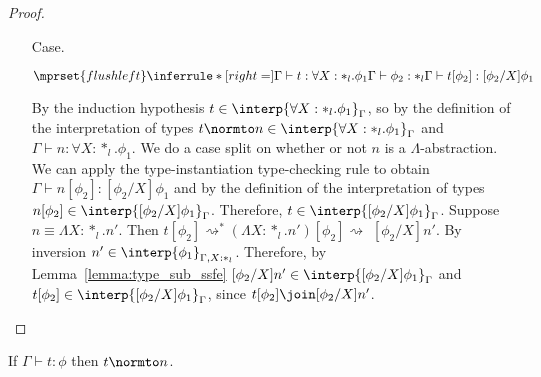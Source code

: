 \begin{proof}
\begin{itemize}
\item[Case.]\ \\
  \begin{center}
    \begin{math}
      $$\mprset{flushleft}
      \inferrule* [right=] {
        \Gamma \vdash t:\forall X:*_l.\phi_1
        \\
        \Gamma \vdash \phi_2:*_l
      }{\Gamma \vdash t[\phi_2]: [\phi_2/X]\phi_1}
    \end{math}
  \end{center}
  By the induction hypothesis $t \in \interp{\forall X:*_l.\phi_1}_\Gamma$, so by the 
  definition of the interpretation of types 
  $t \normto n \in \interp{\forall X:*_l.\phi_1}_\Gamma$ and
  $\Gamma \vdash n:\forall X:*_l.\phi_1$.  We do a case 
  split on whether or not $n$ is a $\Lambda$-abstraction. We can apply the
  type-instantiation type-checking rule to obtain 
  $\Gamma \vdash n[\phi_2]:[\phi_2/X]\phi_1$ and by the 
  definition of the interpretation of types 
  $n[\phi_2] \in \interp{[\phi_2/X]\phi_1}_\Gamma$. Therefore, 
  $t \in \interp{[\phi_2/X]\phi_1}_\Gamma$.  Suppose $n \equiv \Lambda X:*_l.n'$.  
  Then 
  $t[\phi_2] \rightsquigarrow^{*} (\Lambda X:*_l.n')[\phi_2] \rightsquigarrow $
  $ [\phi_2/X]n'$.  By inversion
  $n' \in \interp{\phi_1}_{\Gamma,X:*_l}$. Therefore, by
  Lemma~\ref{lemma:type_sub_ssfe} $[\phi_2/X]n' \in \interp{[\phi_2/X]\phi_1}_{\Gamma}$ and
  $t[\phi_2] \in \interp{[\phi_2/X]\phi_1}_{\Gamma}$, since $t[\phi_2] \join [\phi_2/X]n'$.
\end{itemize}
\end{proof}
\begin{corollary}[Normalization]
  If $\Gamma \vdash t:\phi$ then $t \normto n$.
\end{corollary}

